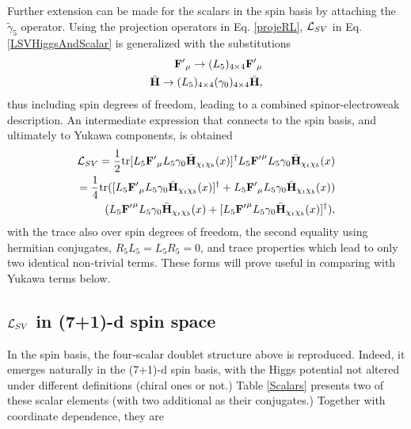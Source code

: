 \documentclass[12pt]{article}
\renewcommand\[{\begin{dmath}}
\renewcommand\]{\end{dmath}}
\begin{document}
  Further extension   can   be made for the scalars in the spin  basis by attaching   the $\tilde \gamma_5$ operator. Using the   projection operators in Eq. \ref {projeRL},
  ${\cal L}_{SV}$ in  Eq.  \ref{LSVHiggsAndScalar}  is   generalized with the substitutions
    \begin{eqnarray} \label{substitu}
   {\bf F'}_\mu\rightarrow (L_ 5)_ {4\times4} {\bf F'}_\mu\\
  \bar{\bf H} \rightarrow (L_ 5) _{4\times4} ( \gamma_ 0)_ {4\times4}  \bar{\bf H} ,
    \end{eqnarray}
  thus  including spin degrees of freedom, leading to   a combined spinor-electroweak description.
 An intermediate expression that connects to the spin basis, and ultimately to   Yukawa  components,  is obtained
\begin{eqnarray}\label{LSVHiggschi} {\cal L}_{SV}= \frac{1}{2}{\rm tr}{[ L_5 {\bf F'}_\mu  L_5\gamma_0 \bar{\bf H}_{\chi_t   \chi_b}(x)}]^\dagger L_5 {\bf F'}^\mu   L_5\gamma_0 \bar{\bf H}_{\chi_t   \chi_b}(x)\\
=\frac{1}{4}{{\rm tr} ([ L_5 {\bf F'}_\mu  L_5\gamma_0 \bar{\bf H}_{\chi_t   \chi_b}(x)}]^\dagger+ L_5 {\bf F'}_\mu   L_5\gamma_0 \bar{\bf H}_{\chi_t   \chi_b}(x)) \\  \nonumber
( L_5 {\bf F'}^\mu   L_5\gamma_0 \bar{\bf H}_{\chi_t   \chi_b}(x)+{[ L_5 {\bf F'}^\mu  L_5\gamma_0 \bar{\bf H}_{\chi_t   \chi_b}(x)}]^\dagger),  \end{eqnarray}
with the trace also over spin degrees of freedom,   the second equality using  hermitian conjugates, $ R_5L_5=L_5 R_5=0$, and trace properties which lead  to only two identical non-trivial terms.
These forms will prove
  useful in comparing with Yukawa terms below.


 \subsection{${\cal L}_{SV}$ in (7+1)-d spin space}
 In the spin basis,   the four-scalar doublet structure above is reproduced. Indeed,    it
emerges naturally in the (7+1)-d spin basis,   with the Higgs potential not altered under different definitions (chiral ones or not.)
    Table \ref{Scalars}    presents    two  of these scalar elements (with two additional as their conjugates.)  Together with coordinate dependence, they are
\end{document}
